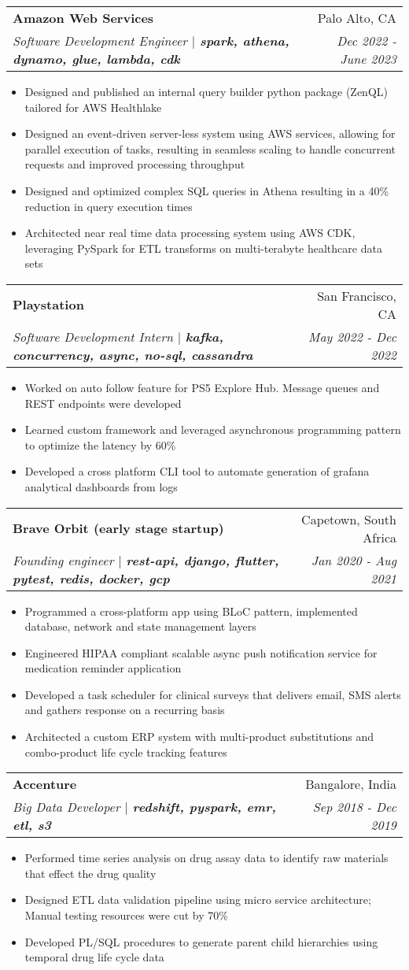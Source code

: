 \documentclass[a4paper,20pt]{article}
\makeatletter
\newcommand{\resumeItemClean}[1]{
    \item\small{
        {#1 \vspace{-2pt}}
    }
}
\newcommand{\resumeSubheading}[4]{
  \vspace{-1pt}\item
    \begin{tabular*}{0.97\textwidth}{l@{\extracolsep{\fill}}r}
      \textbf{#1} & #2 \\
      \textit{#3} & \textit{#4} \\
    \end{tabular*}\vspace{-5pt}
}
\newcommand{\resumeItemListStart}{\begin{itemize}}
\newcommand{\resumeItemListEnd}{\end{itemize}\vspace{-5pt}}
\makeatother
\begin{document}
  \resumeSubheading{Amazon Web Services}{Palo Alto, CA}
    {Software Development Engineer  \(|\) \textbf{spark, athena, dynamo, glue, lambda, cdk}}{Dec 2022 - June 2023}
    \resumeItemListStart
        \resumeItemClean
          {Designed and published an internal query builder python package (ZenQL) tailored for AWS Healthlake}
        \resumeItemClean
          {Designed an event-driven server-less system using AWS services, allowing for parallel execution of tasks, resulting in seamless scaling to handle concurrent requests and improved processing throughput}
        \resumeItemClean
        {Designed and optimized complex SQL queries in Athena resulting in a 40\% reduction in query execution times}
        \resumeItemClean
        {Architected near real time data processing system using AWS CDK, leveraging PySpark for ETL transforms on multi-terabyte healthcare data sets}
        \resumeItemListEnd
        
  \resumeSubheading{Playstation}{San Francisco, CA}
    {Software Development Intern  \(|\) \textbf{kafka, concurrency, async, no-sql, cassandra}}{May 2022 - Dec 2022}
    \resumeItemListStart
        \resumeItemClean
        {Worked on auto follow feature for PS5 Explore Hub. Message queues and REST endpoints were developed}
        \resumeItemClean
          {Learned custom framework and leveraged asynchronous programming pattern to optimize the latency by 60\%}
        \resumeItemClean
          {Developed a cross platform CLI tool to automate generation of grafana analytical dashboards from logs}
        \resumeItemListEnd
        
    \resumeSubheading{Brave Orbit (early stage startup)}{Capetown, South Africa}
    {Founding engineer \(|\) \textbf{rest-api, django, flutter, pytest, redis, docker, gcp}}{Jan 2020 - Aug 2021}
    \resumeItemListStart
        \resumeItemClean
            {Programmed a cross-platform app using BLoC pattern, implemented database, network and state management layers}
          \resumeItemClean
            {Engineered HIPAA compliant scalable async push notification service for medication reminder application}
          \resumeItemClean
            {Developed a task scheduler for clinical surveys that delivers email, SMS alerts and gathers response on a recurring basis}
          \resumeItemClean
            {Architected a custom ERP system with multi-product substitutions and combo-product life cycle tracking features}
    \resumeItemListEnd
      
    \resumeSubheading{Accenture}{Bangalore, India}
    {Big Data Developer \(|\) \textbf{redshift, pyspark, emr, etl, s3}}{Sep 2018 - Dec 2019}
    \resumeItemListStart
        \resumeItemClean
          {Performed time series analysis on drug assay data to identify raw materials that effect the drug quality}
        \resumeItemClean
          {Designed ETL data validation pipeline using micro service architecture; Manual testing resources were cut by 70\%}
        \resumeItemClean
          {Developed PL/SQL procedures to generate parent child hierarchies using temporal drug life cycle data}
        \resumeItemListEnd
\end{document}
